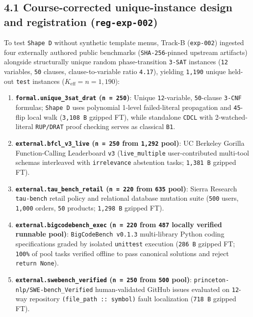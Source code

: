 \documentclass[10pt,letterpaper]{article}
\providecommand{\tightlist}{\setlength{\itemsep}{1pt}\setlength{\parskip}{0pt}}
\begin{document}
\subsection{\texorpdfstring{4.1 Course-corrected unique-instance design
and registration
(\texttt{reg-\allowbreak{}exp-\allowbreak{}002})}{4.1 Course-corrected unique-instance design and registration (reg-exp-002)}}\label{course-corrected-unique-instance-design-and-registration-reg-exp-002}

To test \texttt{Shape\ D} without synthetic template menus, Track-B
(\texttt{exp-002}) ingested four externally authored public benchmarks
(\texttt{SHA-256}-pinned upstream artifacts) alongside structurally
unique random phase-transition \texttt{3-SAT} instances (\texttt{12}
variables, \texttt{50} clauses, clause-to-variable ratio \texttt{4.17}),
yielding \texttt{1,190} unique held-out \texttt{test} instances
(\(K_{\text{eff}} = n = 1,190\)):

\begin{enumerate}
\def\labelenumi{\arabic{enumi}.}
\tightlist
\item
  \textbf{\texttt{formal.\allowbreak{}unique\_\allowbreak{}3sat\_\allowbreak{}drat} (\texttt{n\ =\ 250})}:
  Unique \texttt{12}-variable, \texttt{50}-clause \texttt{3-CNF}
  formulas; \texttt{Shape\ D} uses polynomial 1-level failed-literal
  propagation and \texttt{45}-flip local walk (\texttt{3,108\ B} gzipped
  FT), while standalone \texttt{CDCL} with 2-watched-literal
  \texttt{RUP/DRAT} proof checking serves as classical \texttt{B1}.
\item
  \textbf{\texttt{external.\allowbreak{}bfcl\_\allowbreak{}v3\_\allowbreak{}live} (\texttt{n\ =\ 250} from
  \texttt{1,292} pool)}: UC Berkeley Gorilla Function-Calling
  Leaderboard \texttt{v3} (\texttt{live\_\allowbreak{}multiple} user-contributed
  multi-tool schemas interleaved with \texttt{irrelevance} abstention
  tasks; \texttt{1,381\ B} gzipped FT).
\item
  \textbf{\texttt{external.\allowbreak{}tau\_\allowbreak{}bench\_\allowbreak{}retail} (\texttt{n\ =\ 220} from
  \texttt{635} pool)}: Sierra Research \texttt{tau-bench} retail policy
  and relational database mutation suite (\texttt{500} users,
  \texttt{1,000} orders, \texttt{50} products; \texttt{1,298\ B} gzipped
  FT).
\item
  \textbf{\texttt{external.\allowbreak{}bigcodebench\_\allowbreak{}exec} (\texttt{n\ =\ 220} from
  \texttt{487} locally verified runnable pool)}:
  \texttt{BigCodeBench\ v0.\allowbreak{}1.\allowbreak{}3} multi-library Python coding
  specifications graded by isolated \texttt{unittest} execution
  (\texttt{286\ B} gzipped FT; \texttt{100\%} of pool tasks verified
  offline to pass canonical solutions and reject \texttt{return\ None}).
\item
  \textbf{\texttt{external.\allowbreak{}swebench\_\allowbreak{}verified} (\texttt{n\ =\ 250} from
  \texttt{500} pool)}: \texttt{princeton-\allowbreak{}nlp/\allowbreak{}SWE-\allowbreak{}bench\_\allowbreak{}Verified}
  human-validated GitHub issues evaluated on \texttt{12}-way repository
  \texttt{(\allowbreak{}file\_\allowbreak{}path\ ::\ symbol)} fault localization (\texttt{718\ B}
  gzipped FT).
\end{enumerate}
\end{document}

